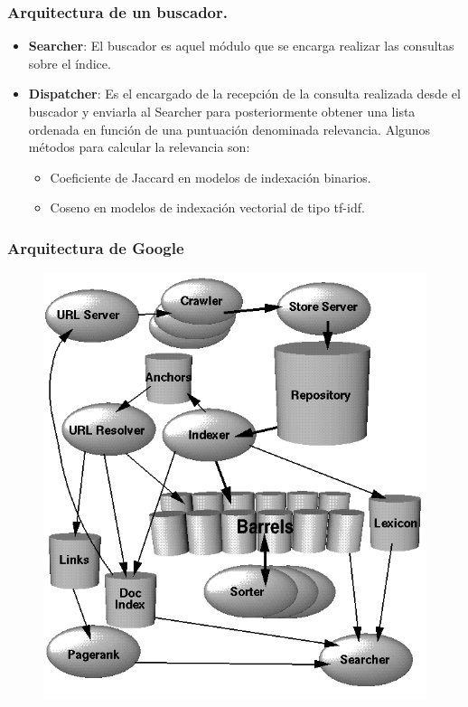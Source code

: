 \documentclass[9pt]{beamer} %
\begin{document}
\begin{frame}
	\frametitle{Arquitectura de un buscador.}

	\begin{itemize}
		\item \textbf{Searcher}: El buscador es aquel módulo que se encarga realizar las consultas sobre el índice.
		\item \textbf{Dispatcher}: Es el encargado de la recepción de la consulta realizada desde el buscador y enviarla al Searcher para posteriormente obtener una lista ordenada en función de una puntuación denominada relevancia. Algunos métodos para calcular la relevancia son:
		\begin{itemize}
			\item Coeficiente de Jaccard en modelos de indexación binarios.
			\item Coseno en modelos de indexación vectorial de tipo tf-idf.
		\end{itemize}
		
	
	\end{itemize}
\end{frame}
\begin{frame}
	\frametitle{Arquitectura de Google}
	\begin{figure}
	\includegraphics[scale=0.33]{img/google_architecture.png}
\end{figure}
	\end{frame}
\end{document}
